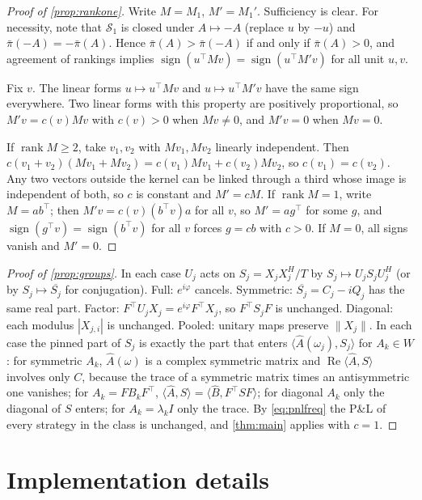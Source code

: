 \documentclass[11pt]{article}
\theoremstyle{definition}
\theoremstyle{remark}
\newcommand{\ip}[2]{\langle #1, #2 \rangle}
\newcommand{\pnl}{\bar{\pi}}
\DeclareMathOperator{\Real}{Re}
\begin{document}
\begin{proof}[Proof of \cref{prop:rankone}]
Write $M=M_1$, $M'=M_1'$. Sufficiency is clear. For necessity, note that $\mathcal{S}_1$ is closed under $A\mapsto -A$ (replace $u$ by $-u$) and $\pnl(-A)=-\pnl(A)$. Hence
$\pnl(A)>\pnl(-A)$ if and only if $\pnl(A)>0$, and agreement of rankings implies $\operatorname{sign}(u^\top Mv)=\operatorname{sign}(u^\top M'v)$ for all unit $u,v$.

Fix $v$. The linear forms $u\mapsto u^\top Mv$ and $u\mapsto u^\top M'v$ have the same sign everywhere. Two linear forms with this property are positively proportional, so
$M'v=c(v)Mv$ with $c(v)>0$ when $Mv\neq0$, and $M'v=0$ when $Mv=0$.

If $\operatorname{rank}M\ge2$, take $v_1,v_2$ with $Mv_1,Mv_2$ linearly independent. Then $c(v_1+v_2)(Mv_1+Mv_2)=c(v_1)Mv_1+c(v_2)Mv_2$, so
$c(v_1)=c(v_2)$. Any two vectors outside the kernel can be linked through a third whose image is independent of both, so $c$ is constant and $M'=cM$. If
$\operatorname{rank}M=1$, write $M=ab^\top$; then $M'v=c(v)(b^\top v)a$ for all $v$, so $M'=ag^\top$ for some $g$, and $\operatorname{sign}(g^\top v)=\operatorname{sign}(b^\top v)$ for all
$v$ forces $g=cb$ with $c>0$. If $M=0$, all signs vanish and $M'=0$.
\end{proof}

\begin{proof}[Proof of \cref{prop:groups}]
In each case $U_j$ acts on $S_j=X_jX_j^H/T$ by $S_j\mapsto U_jS_jU_j^H$ (or by $S_j\mapsto\overline{S_j}$ for conjugation). Full: $e^{i\varphi}$ cancels. Symmetric:
$\overline{S_j}=C_j-iQ_j$ has the same real part. Factor: $F^\top U_jX_j=e^{i\varphi}F^\top X_j$, so $F^\top S_jF$ is unchanged. Diagonal: each modulus $|X_{j,i}|$ is unchanged.
Pooled: unitary maps preserve $\|X_j\|$. In each case the pinned part of $S_j$ is exactly the part that enters $\ip{\hat A(\omega_j)}{S_j}$ for $A_k\in W$: for symmetric $A_k$, $\hat A(\omega)$
is a complex symmetric matrix and $\Real\ip{\hat A}{S}$ involves only $C$, because the trace of a symmetric matrix times an antisymmetric one vanishes; for $A_k=FB_kF^\top$,
$\ip{\hat A}{S}=\ip{\hat B}{F^\top SF}$; for diagonal $A_k$ only the diagonal of $S$ enters; for $A_k=\lambda_kI$ only the trace. By \eqref{eq:pnlfreq} the P\&L of every
strategy in the class is unchanged, and \cref{thm:main} applies with $c=1$.
\end{proof}

\section{Implementation details}
\label{app:impl}
\end{document}
